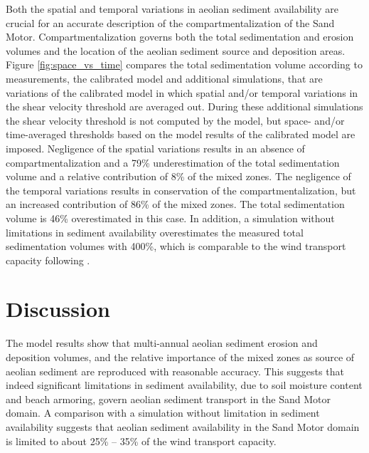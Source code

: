 \documentclass[preprint,12pt,authoryear]{elsarticle}
\begin{document}
Both the spatial and temporal variations in aeolian sediment
availability are crucial for an accurate description of the
compartmentalization of the Sand Motor. Compartmentalization governs
both the total sedimentation and erosion volumes and the location of
the aeolian sediment source and deposition areas. Figure
\ref{fig:space_vs_time} compares the total sedimentation volume
according to measurements, the calibrated model and additional
simulations, that are variations of the calibrated model in which
spatial and/or temporal variations in the shear velocity threshold are
averaged out. During these additional simulations the shear velocity
threshold is not computed by the model, but space- and/or
time-averaged thresholds based on the model results of the calibrated
model are imposed. Negligence of the spatial variations results in an
absence of compartmentalization and a 79\% underestimation of the
total sedimentation volume and a relative contribution of 8\% of the
mixed zones. The negligence of the temporal variations results in
conservation of the compartmentalization, but an increased
contribution of 86\% of the mixed zones. The total sedimentation
volume is 46\% overestimated in this case. In addition, a simulation
without limitations in sediment availability overestimates the
measured total sedimentation volumes with 400\%, which is comparable
to the wind transport capacity following \citet[][Figure
  \ref{fig:models}]{Bagnold1937a}.

\section{Discussion}

The model results show that multi-annual aeolian sediment erosion and
deposition volumes, and the relative importance of the mixed zones as
source of aeolian sediment are reproduced with reasonable
accuracy. This suggests that indeed significant limitations in
sediment availability, due to soil moisture content and beach
armoring, govern aeolian sediment transport in the Sand Motor
domain. A comparison with a simulation without limitation in sediment
availability suggests that aeolian sediment availability in the Sand
Motor domain is limited to about 25\% -- 35\% of the wind transport
capacity.
\end{document}
